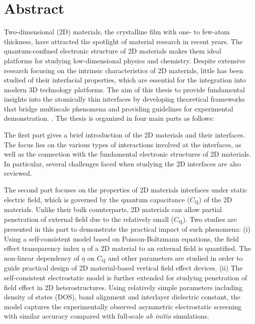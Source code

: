 \begingroup
\let\clearpage\relax
\let\cleardoublepage\relax
\let\cleardoublepage\relax

\chapter*{Abstract}

Two-dimensional (2D) materials, the crystalline film with one- to
few-atom thickness, have attracted the spotlight of material research
in recent years.
% 
The quantum-confined electronic structure of 2D materials makes them ideal platforms for studying low-dimensional physics and chemistry.
% 
Despite extensive research focusing on the intrinsic characteristics
of 2D materials, little has been studied of their interfacial
properties, which are essential for the integration into modern 3D
technology platforms.
%
The aim of this thesis to provide fundamental insights into the
atomically thin interfaces by developing theoretical frameworks that
bridge multiscale phenomena and providing guidelines for experimental
demonstration.  . The thesis is organized
in four main parts as follows:

The first part gives a brief introduction of the 2D materials and
their interfaces.
%
The focus lies on the various types of interactions
involved at the interfaces, as well as the connection with the
fundamental electronic structures of 2D materials.
%
In particular, several challenges faced when studying the
2D interfaces are also reviewed.    

The second part focuses on the properties of 2D materials interfaces
under static electric field, which is governed by the quantum
capacitance ($C_{\mathrm{Q}}$) of the 2D materials.
%
Unlike their bulk
counterparts, 2D materials can allow partial penetration of external
field due to the relatively small ($C_{\mathrm{Q}}$).
%
Two studies are
presented in this part to demonstrate the practical impact of such
phenomena:
%
(i) Using a self-consistent model based on
Poisson-Boltzmann equations, the field effect transparency index
$\eta$ of a 2D material to an external field is quantified. The
non-linear dependency of $\eta$ on $C_{\mathrm{Q}}$ and other
parameters are studied in order to guide practical design of 2D
material-based vertical field effect devices.
%
(ii) The self-consistent
electrostatic model is further extended for studying penetration of
field effect in 2D heterostructures. Using relatively simple
parameters including density of states (DOS), band alignment and
interlayer dielectric constant, the model captures the experimentally observed asymmetric
electrostatic screening with similar accuracy compared with full-scale
\textit{ab initio} simulations.

